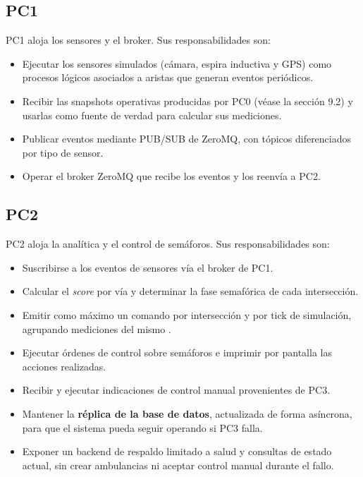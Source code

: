 \documentclass[12pt, a4paper]{article}
\let\oldtexttt\texttt
\renewcommand{\texttt}[1]{\oldtexttt{\seqsplit{#1}}}
\begin{document}
\subsection{PC1}

PC1 aloja los sensores y el broker. Sus responsabilidades son:

\begin{itemize}
    \item Ejecutar los sensores simulados (cámara, espira inductiva y GPS) como procesos lógicos asociados a aristas que generan eventos periódicos.
    \item Recibir las snapshots operativas producidas por PC0 (véase la sección 9.2) y usarlas como fuente de verdad para calcular sus mediciones.
    \item Publicar eventos mediante PUB/SUB de ZeroMQ, con tópicos diferenciados por tipo de sensor.
    \item Operar el broker ZeroMQ que recibe los eventos y los reenvía a PC2.
\end{itemize}

\subsection{PC2}

PC2 aloja la analítica y el control de semáforos. Sus responsabilidades son:

\begin{itemize}
    \item Suscribirse a los eventos de sensores vía el broker de PC1.
    \item Calcular el \textit{score} por vía y determinar la fase semafórica de cada intersección.
    \item Emitir como máximo un comando por intersección y por tick de simulación, agrupando mediciones del mismo \texttt{tick\_origen}.
    \item Ejecutar órdenes de control sobre semáforos e imprimir por pantalla las acciones realizadas.
    \item Recibir y ejecutar indicaciones de control manual provenientes de PC3.
    \item Mantener la \textbf{réplica de la base de datos}, actualizada de forma asíncrona, para que el sistema pueda seguir operando si PC3 falla.
    \item Exponer un backend de respaldo limitado a salud y consultas de estado actual, sin crear ambulancias ni aceptar control manual durante el fallo.
\end{itemize}
\end{document}
